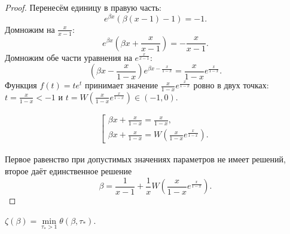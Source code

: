 \begin{proof}
	Перенесём единицу в правую часть:
	\begin{equation*}
		e^{\beta x}(\beta(x - 1) - 1) = -1.
	\end{equation*}
	Домножим на $\frac{x}{x - 1}$:
	\begin{equation*}
		e^{\beta x}\left( \beta x + \frac{x}{x - 1} \right) = -\frac{x}{x - 1}. 
	\end{equation*}
	Домножим обе части уравнения на $e^{\frac{x}{x - 1}}$:
	\begin{equation*}
		\left( \beta x - \frac{x}{1 - x} \right) e^{\beta x - \frac{x}{1 - x}} = \frac{x}{1 - x} e^{\frac{x}{1 - x}}. 
	\end{equation*}
	Функция $f(t) = t e^t$ принимает значение $\frac{x}{1 - x} e^{\frac{x}{1 - x}}$ ровно в двух точках: $t = \frac{x}{1 - x} < -1$ и $t = W\left(\frac{x}{1 - x} e^{\frac{x}{1 - x}}\right) \in (-1, 0)$.
	
	\begin{align*}
		\left[
		\begin{array}{ll}
			\beta x + \frac{x}{1 - x} = \frac{x}{1 - x},\\
			\beta x + \frac{x}{1 - x} = W\left(\frac{x}{1 - x} e^{\frac{x}{1 - x}}\right).
		\end{array}
		\right.
	\end{align*}
	
	Первое равенство при допустимых значениях параметров не имеет решений, второе даёт единственное решение
	\[
	\beta = \frac{1}{x - 1} + \frac{1}{x} W\left(\frac{x}{1 - x} e^{\frac{x}{1 - x}}\right).
	\]
\end{proof}

\begin{proposition}
	\label{prop:zeta_theta}
	$\zeta(\beta) = \min\limits_{\tau_* > 1} \theta(\beta, \tau_*)$.
\end{proposition}

